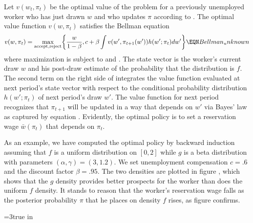 Let $v(w_t,\pi_t)$ be the optimal value of the problem for a previously unemployed worker who has just drawn
$w$ and who updates $\pi$ according to .  The optimal value function $v(w, \pi_t)$ satisfies the Bellman equation
$$ v(w, \pi_t) = \max_{{\rm accept, reject}} \biggl\{ {w \over 1-\beta}, c
  + \beta \int v(w', \pi_{t+1}(w')) h(w'; \pi_t) d w' \biggr\} \EQN Bellman_unknown$$
where maximization is subject to  and .
The state vector is the worker's  current draw $w$ and his post-draw estimate of the probability that the distribution is
$f$.  The second term on the right side of  integrates the value function evaluated at next period's state vector  with respect to the conditional probability
distribution $h(w'; \pi_t)$ of   next period's draw  $w'$. The value function for next period recognizes
 that $\pi_{t+1}$ will be updated in a way that depends on $w'$  via Bayes' law as captured by equation .
%
Evidently, the optimal policy is to set a reservation wage $\bar w(\pi_t)$ that depends on $\pi_t$.

As an example, we have computed the optimal policy by backward induction assuming that $f$ is a uniform distribution
on $[0, 2]$ while $g$ is a beta distribution with parameters $(\alpha, \gamma) =  (3,1.2)$. %
 We set unemployment compensation $c=.6$ and
the discount factor $\beta=.95$. The two densities are plotted
in figure , which shows that the  $g$ density provides better prospects for the worker than
does the uniform $f$ density.  It stands to reason that the worker's reservation wage  falls as the posterior
probability $\pi$ that he places on density $f$ rises, as figure  confirms.
%
%




\centerline{\epsfxsize=3true in}
\caption{Two densities for wages,  a uniform $f(w)$ and  $g(w)$ that is  a beta distribution
with parameters $(\alpha, \gamma) = ( 3, 1.2)$.}
\endfigure



